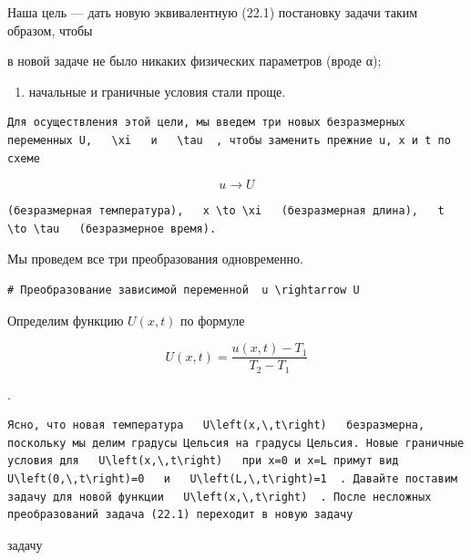 \documentclass[
  ukrainian,
]{article}
\providecommand{\tightlist}{%
  \setlength{\itemsep}{0pt}\setlength{\parskip}{0pt}}
\begin{document}
Наша цель --- дать новую эквивалентную (22.1) постановку задачи таким
образом, чтобы

в новой задаче не было никаких физических параметров (вроде α);

\begin{enumerate}
\def\labelenumi{\arabic{enumi})}
\setcounter{enumi}{1}
\tightlist
\item
  начальные и граничные условия стали проще.
\end{enumerate}

\begin{verbatim}
Для осуществления этой цели, мы введем три новых безразмерных переменных U,   \xi   и   \tau  , чтобы заменить прежние u, x и t по схеме
\end{verbatim}

\[
u \to U
\]

\begin{verbatim}
(безразмерная температура),   x \to \xi   (безразмерная длина),   t \to \tau   (безразмерное время).
\end{verbatim}

Мы проведем все три преобразования одновременно.

\begin{verbatim}
# Преобразование зависимой переменной  u \rightarrow U
\end{verbatim}

Определим функцию \(U(x, t)\) по формуле

\[
U(x, t) = \frac{u(x, t) - T_1}{T_2 - T_1}
\]

.

\begin{verbatim}
Ясно, что новая температура   U\left(x,\,t\right)   безразмерна, поскольку мы делим градусы Цельсия на градусы Цельсия. Новые граничные условия для   U\left(x,\,t\right)   при x=0 и x=L примут вид   U\left(0,\,t\right)=0   и   U\left(L,\,t\right)=1  . Давайте поставим задачу для новой функции   U\left(x,\,t\right)  . После несложных преобразований задача (22.1) переходит в новую задачу
\end{verbatim}

задачу
\end{document}
